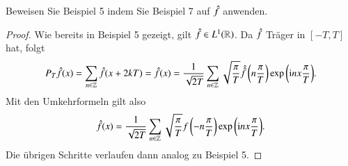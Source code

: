 
\begin{exercise}
  Beweisen Sie Beispiel 5 indem Sie Beispiel 7 auf $\hat{f}$ anwenden.
\end{exercise}

\begin{proof}
  Wie bereits in Beispiel 5 gezeigt, gilt $\hat{f} \in L^1(\mathbb{R})$.
  Da $\hat{f}$ Träger in $[-T,T]$ hat, folgt
  \begin{equation*}
    P_T \hat{f}(x)
    = \sum_{n \in \mathbb{Z}}{\hat{f}(x+2kT)}
    = \hat{f}(x)
    = \frac{1}{\sqrt{2T}} \sum_{n \in \mathbb{Z}}{\sqrt{\frac{\pi}{T}} \hat{\hat{f}}\left(n \frac{\pi}{T}\right)\exp\left(\mathrm{i} nx \frac{\pi}{T}\right)}.
  \end{equation*}
  Mit den Umkehrformeln gilt also
  \begin{equation*}
    \hat{f}(x)=\frac{1}{\sqrt{2T}}\sum_{n \in \mathbb{Z}}{\sqrt{\frac{\pi}{T}}f\left(-n\frac{\pi}{T}\right)\exp\left(\mathrm{i} n x\frac{\pi}{T}\right)}.
  \end{equation*}
  Die übrigen Schritte verlaufen dann analog zu Beispiel 5.
\end{proof}
